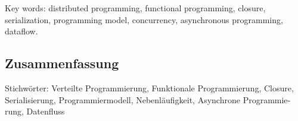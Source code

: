 \vskip0.5cm
Key words: distributed programming, functional programming, closure, serialization, programming model, concurrency, asynchronous programming, dataflow.


\begin{otherlanguage}{german}
\cleardoublepage
\chapter*{Zusammenfassung}

\vskip0.5cm
Stichwörter: Verteilte Programmierung, Funktionale Programmierung, Closure, Serialisierung, Programmiermodell, Nebenläufigkeit, Asynchrone Programmierung, Datenfluss
\end{otherlanguage}



